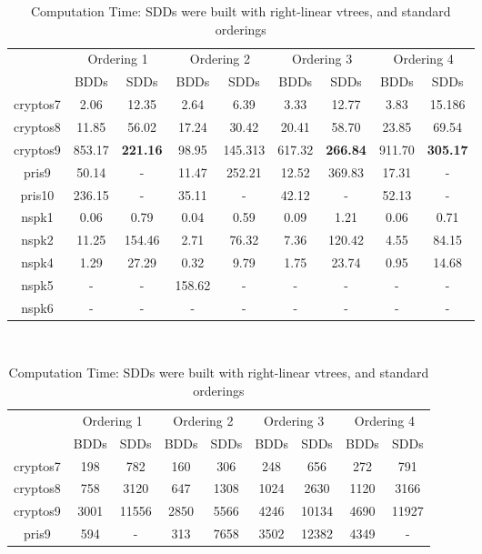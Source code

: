 \documentclass[11pt]{report}
\begin{document}
\begin{table}
\centering
\begin{tabular}{|*{9}{c|}}
\hline
 & \multicolumn{2}{c|}{Ordering 1} & \multicolumn{2}{c|}{Ordering 2} & \multicolumn{2}{c|}{Ordering 3} & \multicolumn{2}{c|}{Ordering 4}\\
\cline{2-9}
& BDDs & SDDs & BDDs & SDDs & BDDs & SDDs & BDDs & SDDs\\ \hline
cryptos7 & 2.06 & 12.35 & 2.64 &  6.39 & 3.33 & 12.77 & 3.83 & 15.186 \\ \hline
cryptos8 & 11.85 & 56.02 & 17.24 & 30.42 & 20.41 & 58.70 & 23.85 & 69.54 \\ \hline
cryptos9 & 853.17 & \textbf{221.16} & 98.95 & 145.313 & 617.32 & \textbf{266.84} & 911.70 & \textbf{305.17} \\ \hline
pris9 & 50.14 & - & 11.47 & 252.21 & 12.52 & 369.83 & 17.31 & - \\ \hline
pris10 & 236.15 & - & 35.11 & - & 42.12 & -& 52.13 & -\\ \hline
nspk1 & 0.06 & 0.79 & 0.04 & 0.59 & 0.09 & 1.21 & 0.06 & 0.71 \\ \hline
nspk2 & 11.25 & 154.46 & 2.71 & 76.32 & 7.36 & 120.42 & 4.55& 84.15 \\ \hline
nspk4 & 1.29 & 27.29 & 0.32 & 9.79 & 1.75 & 23.74 & 0.95 & 14.68 \\ \hline
nspk5 & - & - & 158.62 & - & - & - & - & - \\ \hline
nspk6 & - & - & - &- & - & - & - & - \\ \hline
\end{tabular}
\\
\caption{Computation Time: SDDs were built with right-linear vtrees, and standard orderings}
\label{table:rightlineartime}
\vspace{1in}
\centering
\begin{tabular}{|*{9}{c|}}
\hline
 & \multicolumn{2}{c|}{Ordering 1} & \multicolumn{2}{c|}{Ordering 2} & \multicolumn{2}{c|}{Ordering 3} & \multicolumn{2}{c|}{Ordering 4}\\
\cline{2-9}
& BDDs & SDDs & BDDs & SDDs & BDDs & SDDs & BDDs & SDDs\\ \hline
cryptos7 & 198 & 782 & 160 & 306 & 248 & 656 & 272 & 791 \\ \hline
cryptos8 & 758 & 3120 & 647 & 1308 & 1024 & 2630 & 1120 & 3166  \\ \hline
cryptos9 & 3001 & 11556 & 2850 & 5566 & 4246 & 10134 & 4690 & 11927 \\ \hline
pris9 & 594 & - & 313 & 7658 & 3502 & 12382 & 4349 & -\\ \hline

\end{tabular}
\end{table}
\end{document}
